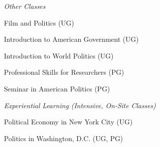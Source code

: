 \documentclass[12pt]{article}
\newcommand{\halfblankline}{\quad\vspace{-0.5\baselineskip}\pagebreak[3]}
\begin{document}
\emph{Other Classes}
    \begin{innerlist}
        \item[] Film and Politics (UG)
    	        	\begin{innerlist}
        		    	\item[] [SU12, AU13]
        		    \end{innerlist}
        \item[] Introduction to American Government (UG)
    	        	\begin{innerlist}
        		    	\item[] [AU08, SP09, SU09, AU09, SP10, AU11, SP12, AU12, SP13, SP14]
        		    \end{innerlist}
        \item[] Introduction to World Politics (UG)
    	        	\begin{innerlist}
        		    	\item[] [SU04, SU05, AU05, SP06, SU06]
        		    \end{innerlist} 
        \item[] Professional Skills for Researchers (PG)
        		    \begin{innerlist}
        		    	\item[] [AY16-17, AY17-18]
        		    \end{innerlist}
        \item[] Seminar in American Politics (PG)
    	        	\begin{innerlist}
        		    	\item[] [AU08]
        		    \end{innerlist}
    \end{innerlist}
    
\halfblankline

\emph{Experiential Learning (Intensive, On-Site Classes)}
    \begin{innerlist}
        \item[] Political Economy in New York City (UG)
    	        	\begin{innerlist}
        		    	\item[] [SU13]
        		    \end{innerlist}
        \item[] Politics in Washington, D.C. (UG, PG)
    	        	\begin{innerlist}
        		    	\item[] [SU09, SU11, SU14]
        		    \end{innerlist}
    \end{innerlist}
\end{document}
